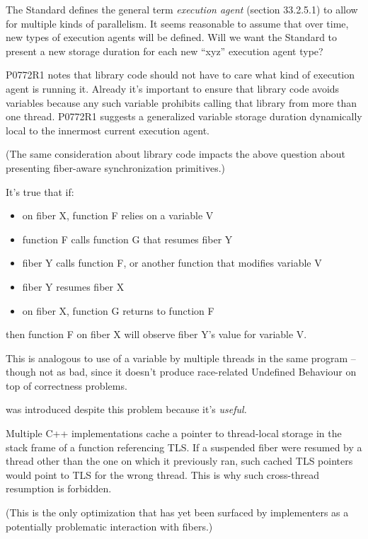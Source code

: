 The Standard defines the general term \emph{execution agent} (section
33.2.5.1) to allow for multiple kinds of parallelism. It seems reasonable to
assume that over time, new types of execution agents will be defined. Will we
want the Standard to present a new  storage duration for each
new ``xyz'' execution agent type?

P0772R1\cite{P0772R1} notes that library code should not have to care what
kind of execution agent is running it. Already it's important to ensure that
library code avoids  variables because any such variable prohibits
calling that library from more than one thread. P0772R1 suggests a generalized
variable storage duration dynamically local to the innermost current execution
agent.

(The same consideration about library code impacts the above question about
presenting fiber-aware synchronization primitives.)

It's true that if:

\begin{itemize}
    \item on fiber X, function F relies on a  variable V
    \item function F calls function G that resumes fiber Y
    \item fiber Y calls function F, or another function that modifies variable V
    \item fiber Y resumes fiber X
    \item on fiber X, function G returns to function F
\end{itemize}

then function F on fiber X will observe fiber Y's value for variable V.

This is analogous to use of a  variable by multiple threads in the
same program -- though not as bad, since it doesn't produce race-related
Undefined Behaviour on top of correctness problems.

 was introduced despite this problem because it's \emph{useful.}

Multiple C++ implementations cache a pointer to thread-local storage in the
stack frame of a function referencing TLS. If a suspended fiber were resumed
by a thread other than the one on which it previously ran, such cached TLS
pointers would point to TLS for the wrong thread. This is why such
cross-thread resumption is forbidden.

(This is the only optimization that has yet been surfaced by implementers as a
potentially problematic interaction with fibers.)

